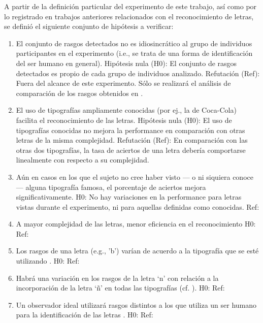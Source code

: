 \documentclass[runningheads,a4paper]{llncs}
\begin{document}
A partir de la definición particular del experimento de este trabajo, así como por lo registrado en trabajos anteriores relacionados con el reconocimiento de letras, se definió el siguiente conjunto de hipótesis a verificar:
\begin{enumerate}
 \item El conjunto de rasgos detectados no es idiosincrático al grupo de individuos participantes en el experimento (i.e., se trata de una forma de identificación del ser humano en general).
    \subitem Hipótesis nula (H0): El conjunto de rasgos detectados es propio de cada grupo de individuos analizado. 
    \subitem Refutación (Ref): Fuera del alcance de este experimento. Sólo se realizará el análisis de comparación de los rasgos obtenidos en \cite{FisetEtAl08:BubblesForLetters}.
 \item El uso de tipografías ampliamente conocidas (por ej., la de Coca-Cola) facilita el reconocimiento de las letras.
    \subitem Hipótesis nula (H0): El uso de tipografías conocidas no mejora la performance en comparación con otras letras de la misma complejidad.
    \subitem Refutación (Ref): En comparación con las otras dos tipografías, la tasa de aciertos de una letra debería comportarse linealmente con respecto a su complejidad.
 \item Aún en casos en los que el sujeto no cree haber visto --- o ni siquiera conoce --- alguna tipografía famosa, el porcentaje de aciertos mejora significativamente.
    \subitem H0: No hay variaciones en la performance para letras vistas durante el experimento, ni para aquellas definidas como conocidas.
    \subitem Ref:
 \item A mayor complejidad de las letras, menor eficiencia en el reconocimiento \cite{PelliEtAl06:LetterIdentification}
    \subitem H0: 
    \subitem Ref:
 \item Los rasgos de una letra (e.g., 'b') varían de acuerdo a la tipografía que se esté utilizando \cite{PelliEtAl06:LetterIdentification}.
    \subitem H0: 
    \subitem Ref:
 \item Habrá una variación en los rasgos de la letra `n' con relación a la incorporación de la letra `ñ' en todas las tipografías (cf. \cite{FisetEtAl08:BubblesForLetters}).
    \subitem H0: 
    \subitem Ref:
 \item Un observador ideal utilizará rasgos distintos a los que utiliza un ser humano para la identificación de las letras \cite{PelliEtAl06:LetterIdentification}.
    \subitem H0: 
    \subitem Ref:
\end{enumerate}
\end{document}
